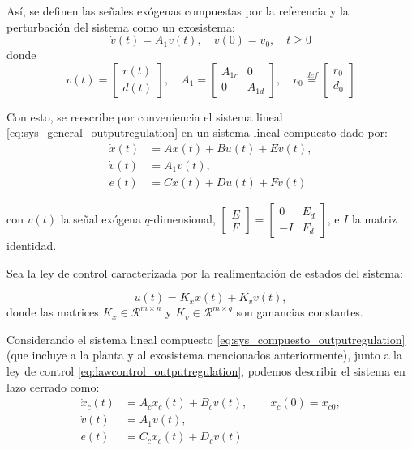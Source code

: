 Así, se definen las señales exógenas compuestas por la referencia y la perturbación del sistema como un exosistema:
\begin{equation}
    \dot{v}(t) = A_1 v(t), \quad v(0) = v_0, \quad t \geq 0 
\end{equation}
donde
\begin{equation*}
    v(t) =\begin{bmatrix} r(t) \\ d(t) \end{bmatrix}, \quad A_1 = \begin{bmatrix} A_{1r} & 0 \\ 0 & A_{1d} \end{bmatrix}, \quad v_0 \overset{def}{=} \begin{bmatrix} r_0 \\ d_0 \end{bmatrix}
\end{equation*}

Con esto, se reescribe por conveniencia el sistema lineal \eqref{eq:sys_general_outputregulation} en un sistema lineal compuesto dado por:
\begin{subequations} \label{eq:sys_compuesto_outputregulation}
    \begin{align}
        \Dot{x}(t) & = A x(t) + B u(t) + E v(t),\\
        \dot{v}(t) & = A_1 v(t), \\ 
        e(t) & = C x(t) + D u(t) + F v(t)
    \end{align}    
\end{subequations}

con $v(t)$ la señal exógena $q$-dimensional, $\begin{bmatrix} E \\ F \end{bmatrix} = \begin{bmatrix} 0 & E_d \\ -I & F_d \end{bmatrix}$, e $I$ la matriz identidad.

Sea la ley de control caracterizada por la realimentación de estados del sistema:

\begin{equation} \label{eq:lawcontrol_outputregulation}
    u(t) = K_x x(t) + K_v v(t),
\end{equation}
donde las matrices $K_x \in \mathcal{R}^{m\times n}$ y $K_v \in \mathcal{R}^{m\times q}$ son ganancias constantes.

Considerando el sistema lineal compuesto \eqref{eq:sys_compuesto_outputregulation} (que incluye a la planta y al exosistema mencionados anteriormente), junto a la ley de control \eqref{eq:lawcontrol_outputregulation}, podemos describir el sistema en lazo cerrado como:
\begin{subequations} \label{eq:sys_acl_outputregulation}
    \begin{align}
        \dot{x}_c (t) & = A_c x_c(t) + B_c v(t), \qquad x_c(0) = x_{c0}, \\
        \dot{v}(t) & = A_1 v(t), \\
        e(t) & = C_c x_c(t) + D_c v(t)
    \end{align}
\end{subequations}

